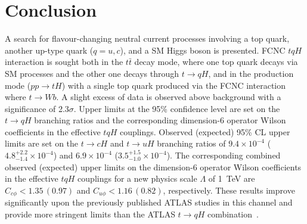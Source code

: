 \section{Conclusion}
\label{sec:conclusion}
A search for flavour-changing neutral current processes involving a top quark, another up-type quark ($q=u, c$), and a SM Higgs boson is presented. FCNC $tqH$ interaction is sought both in the $t\bar{t}$ decay mode, where one top quark decays via SM processes and the other one decays through $t\rightarrow qH$, and in the production mode ($pp\rightarrow tH$) with a single top quark produced via the
FCNC interaction where $t\to Wb$.
A slight excess of data is observed above background with a significance of 2.3$\sigma$. Upper limits at the
95\% confidence level are set on the $t\to qH$ branching ratios and the corresponding
dimension-6 operator Wilson coefficients in the effective $tqH$ couplings. 
Observed (expected) 95\% CL upper limits are set on the $t\to cH$ and $t\to uH$ branching ratios of $9.4\times10^{-4}$ ($4.8^{+2.2}_{-1.4}\times10^{-4}$) and $6.9\times10^{-4}$ ($3.5^{+1.5}_{-1.0}\times10^{-4}$).
The corresponding combined observed (expected) upper limits on the dimension-6 operator Wilson coefficients in
the effective $tqH$ couplings for a new physics scale $\Lambda$ of 1~TeV are $C_{c\phi} <1.35\, (0.97)$ and $C_{u\phi} <1.16\, (0.82)$, respectively.
These results improve significantly upon the previously published ATLAS studies in this channel and provide more stringent limits than the ATLAS  $t\rightarrow qH$ combination~\cite{fcnc36}.
